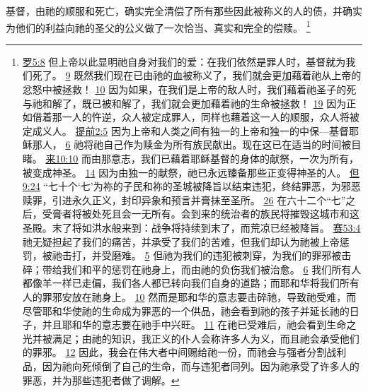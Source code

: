 \documentclass[12pt, a4paper, oneside]{ctexart}
\newcounter{parnum}[section]
\newcommand{\N}{%
   \noindent\refstepcounter{parnum}%
    \makebox[\parindent][l]{\textbf{\arabic{parnum}.}}}
\begin{document}
\N 基督，由祂的顺服和死亡，确实完全清偿了所有那些因此被称义的人的债，并确实为他们的利益向祂的圣父的公义做了一次恰当、真实和完全的偿赎。
	\footnote {
		\href{https://biblehub.com/romans/5-8.htm}{罗5:8} 但上帝以此显明祂自身对我们的爱：在我们依然是罪人时，基督就为我们死了。
		\href{https://biblehub.com/romans/5-9.htm}{9} 既然我们现在已由祂的血被称义了，我们就会更加藉着祂从上帝的忿怒中被拯救！
		\href{https://biblehub.com/romans/5-10.htm}{10} 因为如果，在我们是上帝的敌人时，我们藉着祂圣子的死与祂和解了，既已被和解了，我们就会更加藉着祂的生命被拯救！
		\href{https://biblehub.com/romans/5-19.htm}{19} 因为正如借着那一人的忤逆，众人被定成罪人，同样也藉着这一人的顺服，众人将被定成义人。
		\href{https://biblehub.com/1_timothy/2-5.htm}{提前2:5} 因为上帝和人类之间有独一的上帝和独一的中保---基督耶稣那人，
		\href{https://biblehub.com/1_timothy/2-6.htm}{6} 祂将祂自己作为赎金为所有族民献出。现在这已在适当的时间被目睹。
		\href{https://biblehub.com/hebrews/10-10.htm}{来10:10} 而由那意志，我们已藉着耶稣基督的身体的献祭，一次为所有，被变成神圣。
		\href{https://biblehub.com/hebrews/10-14.htm}{14} 因为由独一的献祭，祂已永远臻备那些正变得神圣的人。
		\href{https://biblehub.com/daniel/9-24.htm}{但9:24} “七十个‘七’为祢的子民和祢的圣城被降旨以结束违犯，终结罪恶，为邪恶赎罪，引进永久正义，封印异象和预言并膏抹至圣所。
		\href{https://biblehub.com/daniel/9-26.htm}{26} 在六十二个“七”之后，受膏者将被处死且会一无所有。会到来的统治者的族民将摧毁这城市和这圣殿。末了将如洪水般来到：战争将持续到末了，而荒凉已经被降旨。
		\href{https://biblehub.com/isaiah/53-4.htm}{赛53:4} 祂无疑担起了我们的痛苦，并承受了我们的苦难，但我们却认为祂被上帝惩罚，被祂击打，并受磨难。
		\href{https://biblehub.com/isaiah/53-5.htm}{5} 但祂为我们的违犯被刺穿，为我们的罪邪被击碎；带给我们和平的惩罚在祂身上，而由祂的负伤我们被治愈。
		\href{https://biblehub.com/isaiah/53-6.htm}{6} 我们所有人都像羊一样已走偏，我们各人都已转向我们自身的道路；而耶和华将我们所有人的罪邪安放在祂身上。
		\href{https://biblehub.com/isaiah/53-10.htm}{10} 然而是耶和华的意志要击碎祂，导致祂受难，而尽管耶和华使祂的生命成为罪恶的一个供品，祂会看到祂的孩子并延长祂的日子，并且耶和华的意志要在祂手中兴旺。
		\href{https://biblehub.com/isaiah/53-11.htm}{11} 在祂已受难后，祂会看到生命之光并被满足；由祂的知识，我正义的仆人会称许多人为义，而且祂会承受他们的罪邪。
		\href{https://biblehub.com/isaiah/53-12.htm}{12} 因此，我会在伟大者中间赐给祂一份，而祂会与强者分割战利品，因为祂向死倾倒了自己的生命，而与违犯者同列。因为祂承受了许多人的罪恶，并为那些违犯者做了调解。
	}
\end{document}
